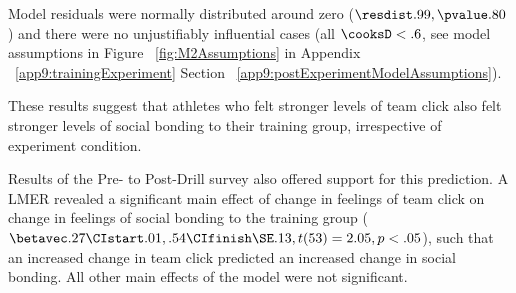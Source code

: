 Model residuals were normally distributed around zero ($\resdist .99, \pvalue .80$) and there were no unjustifiably influential cases (all $\cooksD < .6$, see model assumptions in Figure ~\ref{fig:M2Assumptions} in Appendix ~\ref{app9:trainingExperiment} Section ~\ref{app9:postExperimentModelAssumptions}).

These results suggest that athletes who felt stronger levels of team click also felt stronger levels of social bonding to their training group, irrespective of experiment condition.








Results of the Pre- to Post-Drill survey also offered support for this prediction.  A LMER revealed a significant main effect of change in feelings of team click on change in feelings of social bonding to the training group ($\betavec .27 \CIstart .01, .54 \CIfinish \SE .13, t(53) = 2.05, p < .05$), such that an increased change in team click predicted an increased change in social bonding.  All other main effects of the model were not significant.

